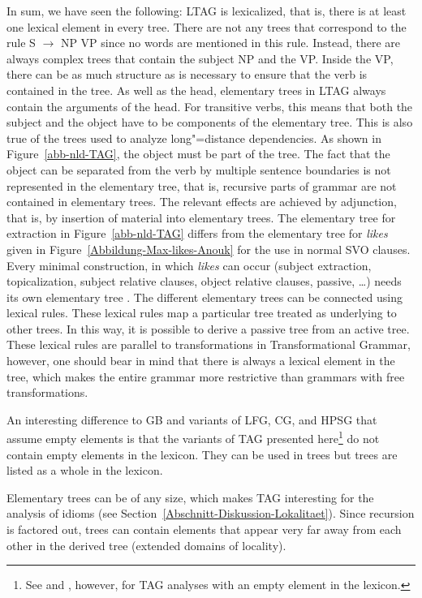 \largerpage
In sum, we have seen the following: LTAG is lexicalized, that is, there is at least one lexical element in every tree.
There are not any trees that correspond to the rule S $\to$ NP VP since no words are mentioned in this rule.
Instead, there are always complex trees that contain the subject NP and the VP. Inside the VP, there can be as much structure
as is necessary to ensure that the verb is contained in the tree. As well as the head, elementary trees in LTAG always contain
the arguments of the head. For transitive verbs, this means that both the subject and the object have to be components of the
elementary tree. This is also true of the trees used to analyze long"=distance dependencies. As shown in Figure~\ref{abb-nld-TAG},
the object must be part of the tree. The fact that the object can be separated from the verb by multiple sentence boundaries is not
represented in the elementary tree, that is, recursive parts of grammar are not contained in elementary trees.
The relevant effects are achieved by adjunction, that is, by insertion of material into elementary trees.
The elementary tree for extraction in Figure~\ref{abb-nld-TAG} differs from the elementary tree for \emph{likes} given in
Figure~\ref{Abbildung-Max-likes-Anouk} for the use in normal SVO clauses. Every minimal construction, in which \emph{likes}
can occur (subject extraction, topicalization, subject relative clauses, object relative clauses, passive, \ldots) needs its own
elementary tree \citep[]{KJ2003a}. The different elementary trees can be connected using lexical rules.
These lexical rules map a particular tree treated as underlying to other trees. In this way, it is possible to derive
a passive tree from an active tree. These lexical rules are parallel to transformations in Transformational
Grammar, however, one should bear in mind that there is always a lexical element in the tree, which makes the entire grammar
more restrictive than grammars with free transformations.

An interesting difference to GB and variants of LFG, CG, and HPSG that assume empty elements is that
the variants of TAG presented here\footnote{%
	See  and , however, for TAG analyses with an empty element in the lexicon.%
} do not contain empty elements in the lexicon. They can be used in trees but trees are listed as a whole in the lexicon.

Elementary trees can be of any size, which makes TAG interesting for the analysis of idioms (see Section~\ref{Abschnitt-Diskussion-Lokalitaet}). 
Since recursion is factored out, trees can contain elements that appear very far away from each other in
the derived tree (extended domains of locality).

